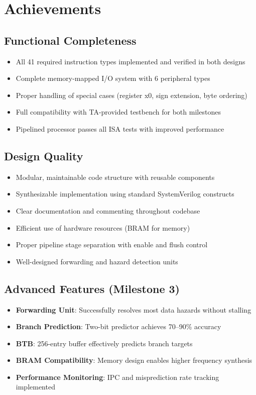 \section{Achievements}

\subsection{Functional Completeness}

\begin{itemize}
    \item All 41 required instruction types implemented and verified in both designs
    \item Complete memory-mapped I/O system with 6 peripheral types
    \item Proper handling of special cases (register x0, sign extension, byte ordering)
    \item Full compatibility with TA-provided testbench for both milestones
    \item Pipelined processor passes all ISA tests with improved performance
\end{itemize}

\subsection{Design Quality}

\begin{itemize}
    \item Modular, maintainable code structure with reusable components
    \item Synthesizable implementation using standard SystemVerilog constructs
    \item Clear documentation and commenting throughout codebase
    \item Efficient use of hardware resources (BRAM for memory)
    \item Proper pipeline stage separation with enable and flush control
    \item Well-designed forwarding and hazard detection units
\end{itemize}

\subsection{Advanced Features (Milestone 3)}

\begin{itemize}
    \item \textbf{Forwarding Unit}: Successfully resolves most data hazards without stalling
    \item \textbf{Branch Prediction}: Two-bit predictor achieves 70--90\% accuracy
    \item \textbf{BTB}: 256-entry buffer effectively predicts branch targets
    \item \textbf{BRAM Compatibility}: Memory design enables higher frequency synthesis
    \item \textbf{Performance Monitoring}: IPC and misprediction rate tracking implemented
\end{itemize}


